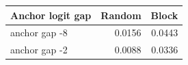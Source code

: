 \small
\begin{tabular}{lrr}\toprule
Anchor logit gap & Random & Block \\\midrule
anchor gap -8 & 0.0156 & 0.0443 \\
anchor gap -2 & 0.0088 & 0.0336 \\
\bottomrule\end{tabular}
